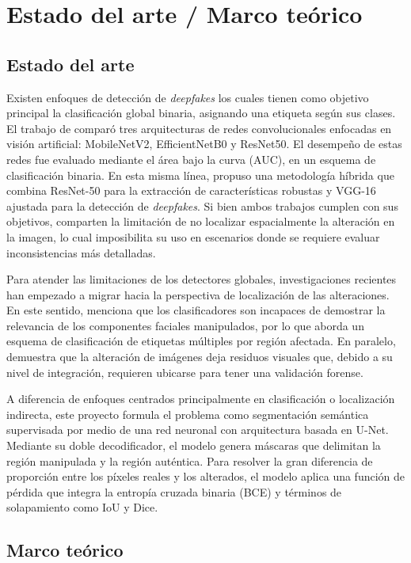 \section{Estado del arte / Marco teórico}
\subsection{Estado del arte}
Existen enfoques de detección de \textit{deepfakes} los cuales tienen como objetivo principal la clasificación global binaria, asignando una etiqueta según sus clases. El trabajo de \textcite{Yagual2024} comparó tres arquitecturas de redes convolucionales enfocadas en visión artificial: MobileNetV2, EfficientNetB0 y ResNet50. El desempeño de estas redes fue evaluado mediante el área bajo la curva (AUC), en un esquema de clasificación binaria. En esta misma línea, \textcite{Tiwari2025} propuso una metodología híbrida que combina ResNet-50 para la extracción de características robustas y VGG-16 ajustada para la detección de \textit{deepfakes}. Si bien ambos trabajos cumplen con sus objetivos, comparten la limitación de no localizar espacialmente la alteración en la imagen, lo cual imposibilita su uso en escenarios donde se requiere evaluar inconsistencias más detalladas.

Para atender las limitaciones de los detectores globales, investigaciones recientes han empezado a migrar hacia la perspectiva de localización de las alteraciones. En este sentido, \textcite{Deng2025} menciona que los clasificadores son incapaces de demostrar la relevancia de los componentes faciales manipulados, por lo que aborda un esquema de clasificación de etiquetas múltiples por región afectada. En paralelo, \textcite{Mashhadani2026} demuestra que la alteración de imágenes deja residuos visuales que, debido a su nivel de integración, requieren ubicarse para tener una validación forense.

A diferencia de enfoques centrados principalmente en clasificación o localización indirecta, este proyecto formula el problema como segmentación semántica supervisada por medio de una red neuronal con arquitectura basada en U-Net. Mediante su doble decodificador, el modelo genera máscaras que delimitan la región manipulada y la región auténtica. Para resolver la gran diferencia de proporción entre los píxeles reales y los alterados, el modelo aplica una función de pérdida que integra la entropía cruzada binaria (BCE) y términos de solapamiento como IoU y Dice.

\subsection{Marco teórico}

